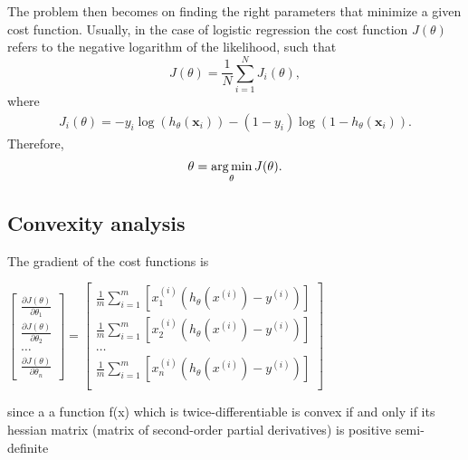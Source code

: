 The problem then becomes on finding the right parameters that minimize a given cost function.   
Usually, in the case of logistic regression the cost function $J(\theta)$ refers to the negative   
logarithm of the likelihood, such that
\begin{equation}
  J(\theta)=\frac{1}{N}\sum_{i=1}^{N} J_i(\theta),
\end{equation}
where
\begin{align}
  J_i(\theta) =  -y_i\log(h_\theta(\mathbf{x}_i)) -(1-y_i)\log(1-h_\theta(\mathbf{x}_i)).
\end{align}
Therefore,
\begin{align}
  \theta = \operatorname*{arg\,min}_\theta J(\theta).
\end{align}


   
   
	\subsection{Convexity analysis}
	
	The gradient of the cost functions is
	
		\begin{center}
		$\left[ \begin{array}{c}
		\frac{\partial J(\theta)}{\partial \theta_1} \\[0.1in]	
		\frac{\partial J(\theta)}{\partial \theta_2} \\[0.1in]	
		\ldots \\[0.1in]	
		\frac{\partial J(\theta)}{\partial \theta_n}
		\end{array} \right] =
		\left[ \begin{array}{c}
		\frac{1}{m}\sum_{i=1}^{m}\left[x_1^{(i)}\left(h_\theta(x^{(i)})-y^{(i)}\right)\right]\\[0.1in]
				\frac{1}{m}\sum_{i=1}^{m}\left[x_2^{(i)}\left(h_\theta(x^{(i)})-y^{(i)}\right)\right]
		\\[0.1in]	
		\ldots \\[0.1in]	
		\frac{1}{m}\sum_{i=1}^{m}\left[x_n^{(i)}\left(h_\theta(x^{(i)})-y^{(i)}\right)\right]
		\\[0.1in]	
		\end{array} \right]$
	\end{center}
	
	since a a function f(x) which is twice-differentiable is convex if and only if its
	hessian matrix (matrix of second-order partial derivatives) is positive semi-definite

